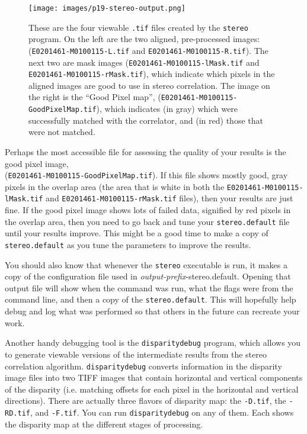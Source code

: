 \begin{figure}[t!]
\begin{minipage}{4in}
\texttt{[image: images/p19-stereo-output.png]}
\end{minipage}
\hfill
\begin{minipage}{2.9in}
\caption[P19 stereo output images]{
    \label{p19-stereo-output}
        These are the four viewable \texttt{.tif} files created by the
        \texttt{stereo} program.  On the left are the two aligned,
        pre-processed images: (\texttt{E0201461-M0100115-L.tif} and
        \texttt{E0201461-M0100115-R.tif}).  The next two are mask images
        (\texttt{E0201461-M0100115-lMask.tif} and
        \texttt{E0201461-M0100115-rMask.tif}), which indicate which
        pixels in the aligned images are good to use in stereo
        correlation.  The image on the right is the ``Good Pixel
        map'', (\texttt{E0201461-M0100115-GoodPixelMap.tif}), which
        indicates (in gray) which were successfully matched with the
        correlator, and (in red) those that were not matched.}
\end{minipage}
\end{figure}

Perhaps the most accessible file for assessing the quality of your
results is the good pixel image,
\\ (\texttt{E0201461-M0100115-GoodPixelMap.tif}).  If this file shows
mostly good, gray pixels in the overlap area (the area that is white
in both the \texttt{E0201461-M0100115-lMask.tif} and
\texttt{E0201461-M0100115-rMask.tif} files), then your results are
just fine.  If the good pixel image shows lots of failed data,
signified by red pixels in the overlap area, then you need to go back
and tune your \texttt{stereo.default} file until your results improve.
This might be a good time to make a copy of \texttt{stereo.default} as
you tune the parameters to improve the results.

You should also know that whenever the \texttt{stereo} executable is
run, it makes a copy of the configuration file used in
\textit{output-prefix}-stereo.default. Opening that output file will
show when the command was run, what the flags were from the command
line, and then a copy of the \texttt{stereo.default}. This will
hopefully help debug and log what was performed so that others in the
future can recreate your work.

Another handy debugging tool is the \texttt{disparitydebug} program,
which allows you to generate viewable versions of the intermediate
results from the stereo correlation algorithm.
\texttt{disparitydebug} converts information in the disparity image
files into two TIFF images that contain horizontal and vertical
components of the disparity (i.e. matching offsets for each pixel in
the horizontal and vertical directions).  There are actually three
flavors of disparity map: the \texttt{-D.tif}, the \texttt{-RD.tif},
and \texttt{-F.tif}.  You can run \texttt{disparitydebug} on any of
them.  Each shows the disparity map at the different stages of
processing.

